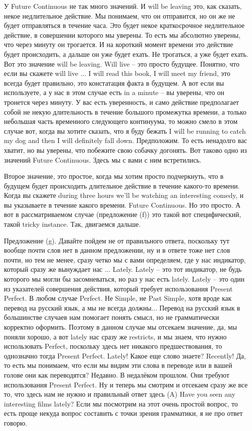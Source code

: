 \documentclass[main.tex]{subfiles}
\begin{document}
У Future Continuous не так много значений.
И will be leaving это, как сказать, некое недлительное действие.
Мы понимаем, что он отправится, но он же не будет отправляться в течение часа.
Это будет некое краткосрочное недлительное действие, в совершении которого мы уверены.
То есть мы абсолютно уверены, что через минуту он трогается.
И на короткий момент времени это действие будет происходить, а дальше он уже будет ехать.
Не трогаться, а уже будет ехать.
Вот это значение will be leaving.
Will live -- это просто будущее.
Понятно, что если вы скажете will live ...
I will read this book, I will meet my friend, это всегда будет правильно, это констатация факта в будущем.
А вот если вы используете, а у нас в этом случае есть in a minute -- вы уверены, что он тронется через минуту.
У вас есть уверенность, и само действие предполагает собой не некую длительность в течение большого промежутка времени, а только небольшая часть временного следующего континуума, то можно смело в этом случае вот, когда вы хотите сказать, что я буду бежать I will be running to catch my dog and then I will definitely fall down.
Предположим.
То есть ненадолго вас хватит, но вы уверены, что побежите свою собачку догонять.
Вот таково одно из значений Future Continuous.
Здесь мы с вами с ним встретились.

Второе значение, это простое, когда мы хотим просто подчеркнуть, что в будущем будет происходить длительное действие в течение какого-то времени.
Когда вы скажете during three hours we'll be watching an interesting comedy, и вы указываете в течение какого времени.
Future Continuous.
Но это просто.
А вот в рассматриваемом случае (предложение (f)) это такой вот специфический, такой tricky instance.
Так, двигаемся дальше.

Предложение (g).
Давайте пойдем не от правильного ответа, поскольку тут вообще почти слов нет в данном предложении, ну и в ответе тоже нет слов почти, но тем не менее, сразу четко мы с вами определяем, где у нас индикатор, который сразу же вынуждает нас ...
Lately.
Lately -- это тот индикатор, не будь которого мы могли бы засомневаться, но раз у нас есть lately.
Lately -- это один из указателей совершения действия, который требует использования Present Perfect.
В любом случае Perfect.
Не Simple, не Past Simple, хотя вроде как перевод на русский язык, а мы не всегда должны...
Перевод на русский язык в большинстве случаев нам помогает понять смысл, но не грамматически корректно оформить.
Поэтому в данном случае мы отсекаем значение, да, мы поняли хорошо, а вот lately нас сразу же restricts, и мы знаем, что нужно использовать Perfect, поскольку здесь нет никакого предшествования, то однозначно тогда Present Perfect.
Lately!
Какое еще слово знаете?
Recently!
Да, то есть мы понимаем, что если мы видим эти слова в переводе или в вашей голове они как переводятся?
Недавно.
В недалёком прошлом.
Они требуют использования Present Perfect.
Ну и теперь мы смотрим и отсекаем сразу же все то, что здесь нам не нужно и правильный ответ здесь (A) Have you seen any interesting films lately?
Если мы посмотрим на этот очень простой вопрос, то есть проще некуда вопрос составить с точки зрения грамматики, я не про ответ говорю.
\end{document}

